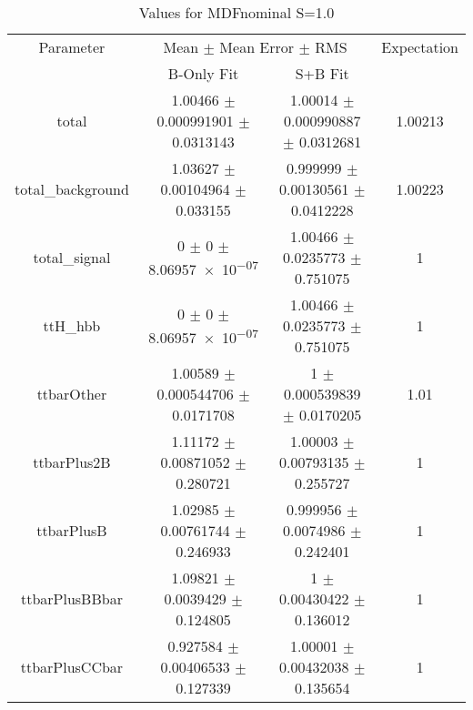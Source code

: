 \begin{table}
\centering
\caption{Values for MDFnominal S=1.0}
\begin{tabular}{cccc}
\toprule
Parameter & \multicolumn{2}{c}{Mean $\pm$ Mean Error $\pm$ RMS} & Expectation\\
 & B-Only Fit & S+B Fit & \\
\midrule
total & \num{1.00466} $\pm$ \num{0.000991901} $\pm$ \num{0.0313143} & \num{1.00014} $\pm$ \num{0.000990887} $\pm$ \num{0.0312681} & \num{1.00213}\\
total\_background & \num{1.03627} $\pm$ \num{0.00104964} $\pm$ \num{0.033155} & \num{0.999999} $\pm$ \num{0.00130561} $\pm$ \num{0.0412228} & \num{1.00223}\\
total\_signal & \num{0} $\pm$ \num{0} $\pm$ \num{8.06957e-07} & \num{1.00466} $\pm$ \num{0.0235773} $\pm$ \num{0.751075} & \num{1}\\
ttH\_hbb & \num{0} $\pm$ \num{0} $\pm$ \num{8.06957e-07} & \num{1.00466} $\pm$ \num{0.0235773} $\pm$ \num{0.751075} & \num{1}\\
ttbarOther & \num{1.00589} $\pm$ \num{0.000544706} $\pm$ \num{0.0171708} & \num{1} $\pm$ \num{0.000539839} $\pm$ \num{0.0170205} & \num{1.01}\\
ttbarPlus2B & \num{1.11172} $\pm$ \num{0.00871052} $\pm$ \num{0.280721} & \num{1.00003} $\pm$ \num{0.00793135} $\pm$ \num{0.255727} & \num{1}\\
ttbarPlusB & \num{1.02985} $\pm$ \num{0.00761744} $\pm$ \num{0.246933} & \num{0.999956} $\pm$ \num{0.0074986} $\pm$ \num{0.242401} & \num{1}\\
ttbarPlusBBbar & \num{1.09821} $\pm$ \num{0.0039429} $\pm$ \num{0.124805} & \num{1} $\pm$ \num{0.00430422} $\pm$ \num{0.136012} & \num{1}\\
ttbarPlusCCbar & \num{0.927584} $\pm$ \num{0.00406533} $\pm$ \num{0.127339} & \num{1.00001} $\pm$ \num{0.00432038} $\pm$ \num{0.135654} & \num{1}\\
\bottomrule
\end{tabular}
\end{table}